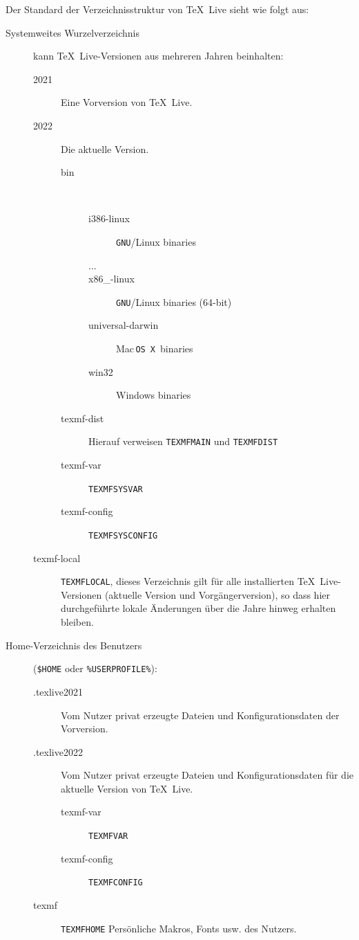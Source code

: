\documentclass[12pt,ngerman,a4paper,fullparskip]{scrreprt}
\newcommand{\TL}{\TeX\ Live\xspace}
\newcommand{\acro}[1]{\texttt{#1}}
\newcommand{\envname}[1]{\texttt{#1}}
\providecommand*{\GNU}{\acro{GNU}\xspace}
\providecommand*{\MacOSX}{Mac\,\acro{OS\,X}\xspace}
\begin{document}
Der Standard der Verzeichnisstruktur von \TL sieht wie folgt aus:
\begin{description}
  \item[Systemweites Wurzelverzeichnis] kann \TL{}-Versionen aus mehreren Jahren beinhalten:
  \begin{description}
    \item[2021] Eine Vorversion von \TL.
    \item[2022] Die aktuelle Version.
    \begin{description}
      \item [bin] ~
      \begin{description}
        \item [i386-linux] \GNU/Linux binaries
        \item [...]
        \item [x86\_-linux] \GNU/Linux binaries (64-bit)
        \item [universal-darwin] \MacOSX\ binaries
        \item [win32] Windows binaries
      \end{description}
      \item [texmf-dist\ \ ] Hierauf verweisen \envname{TEXMFMAIN} und \envname{TEXMFDIST}
      \item [texmf-var\ \ ] \envname{TEXMFSYSVAR}
      \item [texmf-config \ \ ] \envname{TEXMFSYSCONFIG}
    \end{description}
    \item [texmf-local] \envname{TEXMFLOCAL}, dieses Verzeichnis gilt für alle installierten \TL-Versionen
         (aktuelle Version und Vorgängerversion), so dass hier durchgeführte lokale Änderungen über die
         Jahre hinweg erhalten bleiben.
  \end{description}
  \item[Home-Verzeichnis des Benutzers]
      (\texttt{\$HOME} oder \texttt{\%USERPROFILE\%}):
    \begin{description}
      \item[.texlive2021] Vom Nutzer privat erzeugte Dateien und Konfigurationsdaten
        der Vorversion.
      \item[.texlive2022] Vom Nutzer privat erzeugte Dateien und Konfigurationsdaten
        für die aktuelle Version von \TL.
      \begin{description}
        \item [texmf-var\ \ \ ] \envname{TEXMFVAR}
        \item [texmf-config] \envname{TEXMFCONFIG}
      \end{description}
    \item[texmf] \envname{TEXMFHOME} Persönliche Makros, Fonts usw. des Nutzers.
  \end{description}
\end{description}
\end{document}

